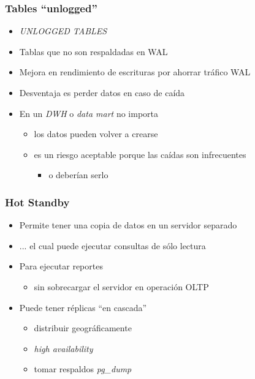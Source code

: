 \frame
{ \frametitle{Tables “unlogged”}

\begin{itemize}
	\item \emph{UNLOGGED TABLES}
	\item Tablas que no son respaldadas en WAL
	\item Mejora en rendimiento de escrituras por ahorrar tráfico WAL
	\item Desventaja es perder datos en caso de caída
	\pause
	\item En un \emph{DWH} o \emph{data mart} no importa
		\begin{itemize}
			\item los datos pueden volver a crearse
			\item es un riesgo aceptable porque las caídas son infrecuentes
				\begin{itemize}
					\item o deberían serlo
				\end{itemize}
		\end{itemize}
\end{itemize}
}

\frame
{ \frametitle{Hot Standby}

\begin{itemize}
	\item Permite tener una copia de datos en un servidor separado
	\item ... el cual puede ejecutar consultas de sólo lectura
	\item Para ejecutar reportes
		\begin{itemize}
			\item sin sobrecargar el servidor en operación OLTP
		\end{itemize}
	\item Puede tener réplicas “en cascada”
		\begin{itemize}
			\item distribuir geográficamente
			\item \emph{high availability}
			\item tomar respaldos \emph{pg\_dump}
		\end{itemize}
\end{itemize}
}

